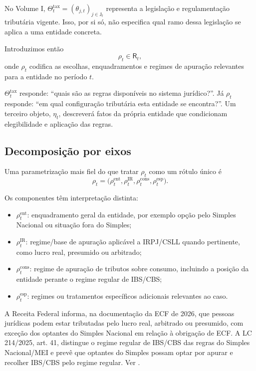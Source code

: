 \documentclass[11pt,a4paper]{article}
\begin{document}
No Volume I, $\Theta_t^{\mathrm{tax}}=(\theta_{j,t})_{j\in\mathsf J_t}$ representa a legislação e regulamentação tributária vigente. Isso, por si só, não especifica qual ramo dessa legislação se aplica a uma entidade concreta.

Introduzimos então
\begin{equation}
\boxed{\rho_t\in\mathsf R_t,}
\label{eq:rho}
\end{equation}
onde $\rho_t$ codifica as escolhas, enquadramentos e regimes de apuração relevantes para a entidade no período $t$.

\begin{intuicao}
$\Theta_t^{\mathrm{tax}}$ responde: ``quais são as regras disponíveis no sistema jurídico?''. Já $\rho_t$ responde: ``em qual configuração tributária esta entidade se encontra?''. Um terceiro objeto, $\eta_t$, descreverá fatos da própria entidade que condicionam elegibilidade e aplicação das regras.
\end{intuicao}

\subsection{Decomposição por eixos}

Uma parametrização mais fiel do que tratar $\rho_t$ como um rótulo único é
\begin{equation}
\boxed{
\rho_t=
\bigl(
\rho_t^{\mathrm{ent}},
\rho_t^{\mathrm{IR}},
\rho_t^{\mathrm{cons}},
\rho_t^{\mathrm{esp}}
\bigr).
}
\label{eq:rho-decomp}
\end{equation}

Os componentes têm interpretação distinta:
\begin{itemize}
    \item $\rho_t^{\mathrm{ent}}$: enquadramento geral da entidade, por exemplo opção pelo Simples Nacional ou situação fora do Simples;
    \item $\rho_t^{\mathrm{IR}}$: regime/base de apuração aplicável a IRPJ/CSLL quando pertinente, como lucro real, presumido ou arbitrado;
    \item $\rho_t^{\mathrm{cons}}$: regime de apuração de tributos sobre consumo, incluindo a posição da entidade perante o regime regular de IBS/CBS;
    \item $\rho_t^{\mathrm{esp}}$: regimes ou tratamentos específicos adicionais relevantes ao caso.
\end{itemize}

\begin{fonte}
A Receita Federal informa, na documentação da ECF de 2026, que pessoas jurídicas podem estar tributadas pelo lucro real, arbitrado ou presumido, com exceção dos optantes do Simples Nacional em relação à obrigação de ECF. A LC 214/2025, art. 41, distingue o regime regular de IBS/CBS das regras do Simples Nacional/MEI e prevê que optantes do Simples possam optar por apurar e recolher IBS/CBS pelo regime regular. Ver \cite{RFB_ECF_2026,LC214}.
\end{fonte}
\end{document}
